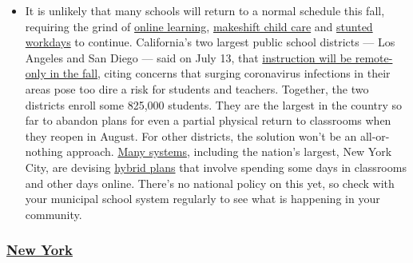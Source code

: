 \begin{itemize}
  \begin{itemize}
  \tightlist
  \item
    It is unlikely that many schools will return to a normal schedule
    this fall, requiring the grind of
    \href{https://www.nytimes.com/2020/06/05/us/coronavirus-education-lost-learning.html?action=click\&pgtype=Article\&state=default\&region=MAIN_CONTENT_3\&context=storylines_faq}{online
    learning},
    \href{https://www.nytimes.com/2020/05/29/us/coronavirus-child-care-centers.html?action=click\&pgtype=Article\&state=default\&region=MAIN_CONTENT_3\&context=storylines_faq}{makeshift
    child care} and
    \href{https://www.nytimes.com/2020/06/03/business/economy/coronavirus-working-women.html?action=click\&pgtype=Article\&state=default\&region=MAIN_CONTENT_3\&context=storylines_faq}{stunted
    workdays} to continue. California's two largest public school
    districts --- Los Angeles and San Diego --- said on July 13, that
    \href{https://www.nytimes.com/2020/07/13/us/lausd-san-diego-school-reopening.html?action=click\&pgtype=Article\&state=default\&region=MAIN_CONTENT_3\&context=storylines_faq}{instruction
    will be remote-only in the fall}, citing concerns that surging
    coronavirus infections in their areas pose too dire a risk for
    students and teachers. Together, the two districts enroll some
    825,000 students. They are the largest in the country so far to
    abandon plans for even a partial physical return to classrooms when
    they reopen in August. For other districts, the solution won't be an
    all-or-nothing approach.
    \href{https://bioethics.jhu.edu/research-and-outreach/projects/eschool-initiative/school-policy-tracker/}{Many
    systems}, including the nation's largest, New York City, are
    devising
    \href{https://www.nytimes.com/2020/06/26/us/coronavirus-schools-reopen-fall.html?action=click\&pgtype=Article\&state=default\&region=MAIN_CONTENT_3\&context=storylines_faq}{hybrid
    plans} that involve spending some days in classrooms and other days
    online. There's no national policy on this yet, so check with your
    municipal school system regularly to see what is happening in your
    community.
  \end{itemize}
\end{itemize}

\hypertarget{new-york}{%
\subsubsection{\texorpdfstring{\href{https://coronavirus.health.ny.gov/covid-19-travel-advisory}{New
York}}{New York}}\label{new-york}}

